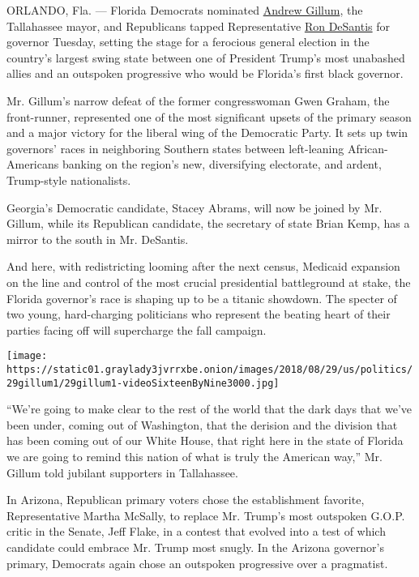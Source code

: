ORLANDO, Fla. --- Florida Democrats nominated
\href{https://www.nytimes3xbfgragh.onion/2018/08/28/us/politics/andrew-gillum-florida.html}{Andrew
Gillum}, the Tallahassee mayor, and Republicans tapped Representative
\href{https://www.nytimes3xbfgragh.onion/2018/08/29/us/politics/ron-desantis-bio-facts.html}{Ron
DeSantis} for governor Tuesday, setting the stage for a ferocious
general election in the country's largest swing state between one of
President Trump's most unabashed allies and an outspoken progressive who
would be Florida's first black governor.

Mr. Gillum's narrow defeat of the former congresswoman Gwen Graham, the
front-runner, represented one of the most significant upsets of the
primary season and a major victory for the liberal wing of the
Democratic Party. It sets up twin governors' races in neighboring
Southern states between left-leaning African-Americans banking on the
region's new, diversifying electorate, and ardent, Trump-style
nationalists.

Georgia's Democratic candidate, Stacey Abrams, will now be joined by Mr.
Gillum, while its Republican candidate, the secretary of state Brian
Kemp, has a mirror to the south in Mr. DeSantis.

And here, with redistricting looming after the next census, Medicaid
expansion on the line and control of the most crucial presidential
battleground at stake, the Florida governor's race is shaping up to be a
titanic showdown. The specter of two young, hard-charging politicians
who represent the beating heart of their parties facing off will
supercharge the fall campaign.

\texttt{[image: https://static01.graylady3jvrrxbe.onion/images/2018/08/29/us/politics/29gillum1/29gillum1-videoSixteenByNine3000.jpg]}

``We're going to make clear to the rest of the world that the dark days
that we've been under, coming out of Washington, that the derision and
the division that has been coming out of our White House, that right
here in the state of Florida we are going to remind this nation of what
is truly the American way,'' Mr. Gillum told jubilant supporters in
Tallahassee.

In Arizona, Republican primary voters chose the establishment favorite,
Representative Martha McSally, to replace Mr. Trump's most outspoken
G.O.P. critic in the Senate, Jeff Flake, in a contest that evolved into
a test of which candidate could embrace Mr. Trump most snugly. In the
Arizona governor's primary, Democrats again chose an outspoken
progressive over a pragmatist.

